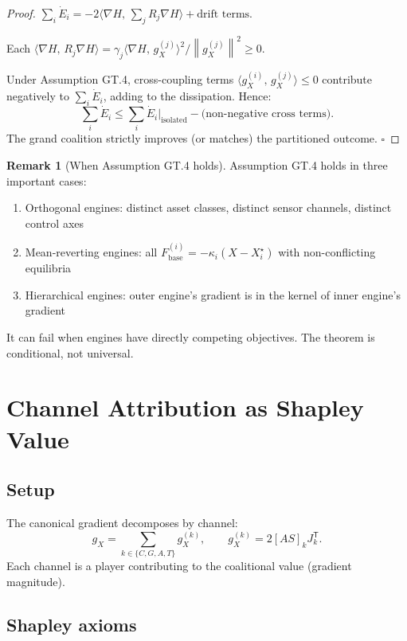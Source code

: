 \documentclass[11pt,a4paper]{article}
\theoremstyle{definition}
\newtheorem{remark}[theorem]{Remark}
\newcommand{\T}{^{\mathsf{T}}}
\newcommand{\norm}[1]{\left\|#1\right\|}
\newcommand{\inner}[2]{\langle #1,\,#2\rangle}
\newcommand{\Fbase}{F_{\mathrm{base}}}
\newcommand{\gX}{g_X}
\begin{document}
\begin{proof}
$\sum_i \dot E_i = -2\inner{\nabla H}{\sum_j R_j\nabla H} + \text{drift terms}$.

Each $\inner{\nabla H}{R_j\nabla H} = \gamma_j\inner{\nabla H}{g_X^{(j)}}^2/\norm{g_X^{(j)}}^2 \geq 0$.

Under Assumption GT.4, cross-coupling terms $\inner{g_X^{(i)}}{g_X^{(j)}} \leq 0$ contribute negatively to $\sum_i\dot E_i$,
adding to the dissipation. Hence:
\[
\sum_i\dot E_i \leq \sum_i\dot E_i\big|_\text{isolated} - \text{(non-negative cross terms)}.
\]
The grand coalition strictly improves (or matches) the partitioned outcome. $\square$
\end{proof}

\begin{remark}[When Assumption GT.4 holds]
Assumption GT.4 holds in three important cases:
\begin{enumerate}
\item Orthogonal engines: distinct asset classes, distinct sensor channels, distinct control axes
\item Mean-reverting engines: all $\Fbase^{(i)} = -\kappa_i(X-X^\star_i)$ with non-conflicting equilibria
\item Hierarchical engines: outer engine's gradient is in the kernel of inner engine's gradient
\end{enumerate}
It can fail when engines have directly competing objectives. The theorem is conditional, not universal.
\end{remark}

\section{Channel Attribution as Shapley Value}

\subsection{Setup}

The canonical gradient decomposes by channel:
\[
\gX = \sum_{k\in\{C,G,A,T\}} g_X^{(k)}, \qquad g_X^{(k)} = 2[AS]_k J_k\T.
\]
Each channel is a player contributing to the coalitional value (gradient magnitude).

\subsection{Shapley axioms}
\end{document}
